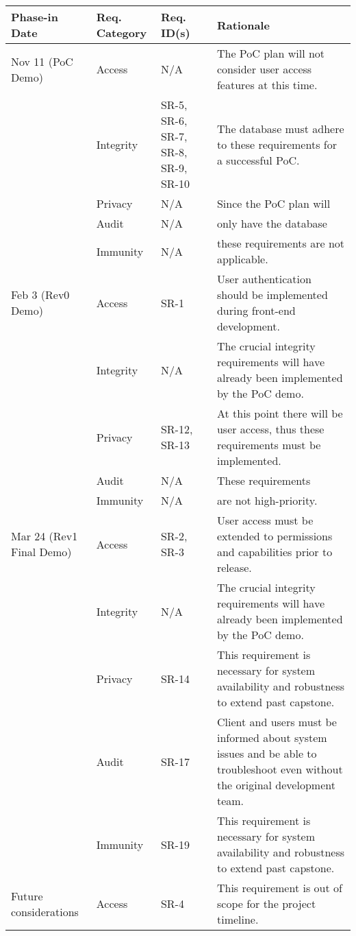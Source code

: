 \documentclass{article}
\begin{document}
\begin{longtable}[c]{|m{2.5cm}|m{2.6cm}|m{2cm}|m{3.6cm}|}
    \hline
    \textbf{Phase-in Date} & \textbf{Req. Category} & \textbf{Req. ID(s)} & \textbf{Rationale} \\
    \hline
    \endhead
    Nov 11 (PoC Demo) & Access & N/A & The PoC plan will not consider user access features at this time.\\
    \cline{2-4}
    & Integrity & SR-5, SR-6, SR-7, SR-8, SR-9, SR-10 & The database must adhere to these requirements for a successful PoC.\\
    \cline{2-4}
    & Privacy & N/A & Since the PoC plan will\\
    & Audit & N/A & only have the database\\
    & Immunity & N/A & these requirements are not applicable.\\
    \hline
    Feb 3 (Rev0 Demo) & Access & SR-1 & User authentication should be implemented during front-end development.\\
    \cline{2-4}
    & Integrity & N/A & The crucial integrity requirements will have already been implemented by the PoC demo.\\
    \cline{2-4}
    & Privacy & SR-12, SR-13 & At this point there will be user access, thus these requirements must be implemented.\\
    \cline{2-4}
    & Audit & N/A & These requirements\\
    & Immunity & N/A & are not high-priority.\\
    \hline
    Mar 24 (Rev1 Final Demo) & Access & SR-2, SR-3 & User access must be extended to permissions and capabilities prior to release.\\
    \cline{2-4}
    & Integrity & N/A & The crucial integrity requirements will have already been implemented by the PoC demo.\\
    \cline{2-4}
    & Privacy & SR-14 & This requirement is necessary for system availability and robustness to extend past capstone.\\
    \cline{2-4}
    & Audit & SR-17 & Client and users must be informed about system issues and be able to troubleshoot even without the original development team.\\
    \cline{2-4}
    & Immunity & SR-19 & This requirement is necessary for system availability and robustness to extend past capstone.\\
    \hline
    Future considerations & Access & SR-4 & This requirement is out of scope for the project timeline.\\

\end{longtable}
\end{document}
